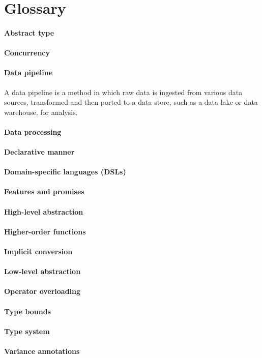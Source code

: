 \chapter*{Glossary}

\subsubsection{Abstract type}
\subsubsection{Concurrency}
\subsubsection{Data pipeline}

A data pipeline is a method in which raw data is ingested from various data sources, transformed and then ported to a data store, such as a data lake or data warehouse, for analysis.

\subsubsection{Data processing}
\subsubsection{Declarative manner}
\subsubsection{Domain-specific languages (DSLs)}
\subsubsection{Features and promises}
\subsubsection{High-level abstraction}
\subsubsection{Higher-order functions}
\subsubsection{Implicit conversion}
\subsubsection{Low-level abstraction}
\subsubsection{Operator overloading}
\subsubsection{Type bounds}
\subsubsection{Type system}
\subsubsection{Variance annotations}